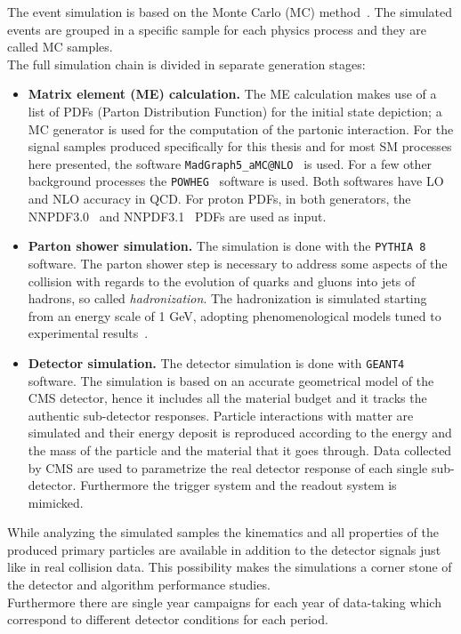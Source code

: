 The event simulation is based on the Monte Carlo (MC)
method~\cite{mc}. The simulated events
 are grouped in a specific
sample for each physics process and they are called MC samples.\\
The full simulation chain is divided in separate generation stages:
\begin{itemize}
\setlength\itemsep{-0.1em}
\item \textbf{Matrix element (ME) calculation.} The ME calculation
  makes use of a list of PDFs (Parton Distribution Function) for the initial state
  depiction; a MC generator is used for the computation of the
  partonic interaction.
 For the signal samples produced specifically for this thesis and for
  most SM processes here presented, the software
  \texttt{MadGraph5\_aMC@NLO}~\cite{Alwall_2014} is used. For a few other background processes 
  the \texttt{POWHEG}~\cite{Alioli_2010} software is used. Both
  softwares have LO and NLO accuracy in QCD. For proton PDFs, in both
  generators, the NNPDF3.0~\cite{Ball_2015} and
  NNPDF3.1~\cite{Ball_2017} PDFs are used as input.
\item \textbf{Parton shower simulation.} The simulation is done with
  the \texttt{PYTHIA 8}~\cite{Sj_strand_2008, Sj_strand_2015}
  software. The parton shower step is necessary to address some aspects
  of the collision with regards to the evolution of quarks and gluons into jets of
  hadrons, so called \emph{hadronization}. The hadronization is
  simulated starting from an energy scale of 1 GeV, adopting phenomenological models tuned to
  experimental results~\cite{Skands_2014, Khachatryan_2016_ps, Sirunyan_2020_ps}.
\item \textbf{Detector simulation.} The detector simulation is done
  with \texttt{GEANT4}~\cite{AGOSTINELLI2003250} software. The
  simulation is based on an accurate geometrical model of the CMS
  detector, hence it includes all the material budget and it tracks
  the authentic sub-detector responses. Particle interactions with
  matter are simulated and their energy deposit is reproduced according to the
  energy and the mass of the particle and the material that it goes through. Data collected by CMS are used to
  parametrize the real detector response of each single
  sub-detector. Furthermore the trigger system and the readout system
  is mimicked. 
\end{itemize}

While analyzing the simulated samples the kinematics and all
properties of the produced primary particles are available in addition
to the detector signals just like in real collision data. This
possibility makes the simulations a corner stone of the detector and
algorithm performance studies.\\
Furthermore there are single year campaigns for
each year of data-taking which correspond to different detector
conditions for each period. 



